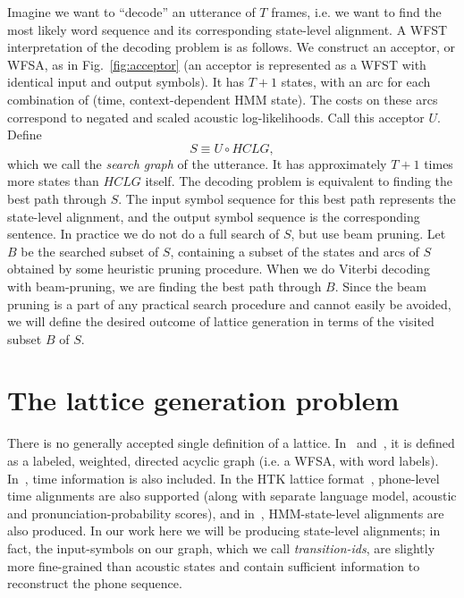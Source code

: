 \documentclass{article}
\def\HCLG{{\mathit{HCLG}}}
\begin{document}
Imagine we want to ``decode'' an utterance of $T$ frames, i.e. we want to
find the most likely word sequence and its corresponding state-level alignment.  A WFST
interpretation of the decoding problem is as follows.  We construct an
acceptor, or WFSA, as in Fig.~\ref{fig:acceptor} (an acceptor is represented as a
WFST with identical input and output symbols).  It has $T{+}1$ states,
with an arc for each combination of (time, context-dependent HMM state).  The
costs on these arcs correspond to negated and scaled acoustic log-likelihoods.
Call this acceptor $U$.  Define
\begin{equation}
   S \equiv U \circ \HCLG,
\end{equation}
which we call the {\em search graph} of the utterance.  It has approximately $T{+}1$ times
more states than $\HCLG$ itself.  The decoding problem is equivalent to finding
the best path through $S$.  The input symbol sequence for this best path represents
the state-level alignment, and the output symbol sequence is the corresponding
sentence.  In practice we do not do a full search of $S$, but use beam pruning.
Let $B$ be the searched subset of $S$, containing a subset of the states and arcs
of $S$ obtained by some heuristic pruning procedure.  
When we do Viterbi decoding with beam-pruning, we are finding the best path through $B$. 
%
Since the beam pruning is a part of any practical search procedure and cannot
easily be avoided, we will define the desired outcome of lattice generation in terms
of the visited subset $B$ of $S$.

\vspace*{-0.075in}
\section{The lattice generation problem}
\vspace*{-0.05in}
\label{sec:lattices}


There is no generally accepted single definition of a lattice.  In~\cite{efficient_general}
and~\cite{sak2010fly}, it is defined as a labeled, weighted, directed acyclic graph
(i.e. a WFSA, with word labels).  In~\cite{ney_word_graph}, time information
is also included.  In the HTK lattice format~\cite{htkbook}, phone-level time alignments 
are also supported (along with separate language model, acoustic and pronunciation-probability 
scores), and in~\cite{saon2005anatomy}, HMM-state-level alignments are also produced.
In our work here we will be producing state-level alignments; in fact, the input-symbols
on our graph, which we call {\em transition-ids}, are slightly more fine-grained
than acoustic states and contain sufficient information to reconstruct the phone
sequence.  
\end{document}
